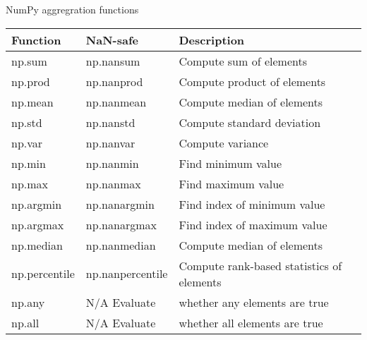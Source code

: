 \documentclass[10pt]{beamer}
\begin{document}
\begin{frame}{NumPy aggregration functions}
\begin{table}
\begin{tabular}{lll}
\textbf{Function} & \textbf{NaN-safe} & \textbf{Description}  \\
\hline
np.sum          & np.nansum        & Compute sum of elements\\
np.prod         & np.nanprod       & Compute product of elements\\
np.mean         & np.nanmean       & Compute median of elements \\
np.std          & np.nanstd        & Compute standard deviation \\
np.var          & np.nanvar        & Compute variance \\
np.min          & np.nanmin        & Find minimum value \\
np.max          & np.nanmax        & Find maximum value \\
np.argmin       & np.nanargmin     & Find index of minimum value \\
np.argmax       & np.nanargmax     & Find index of maximum value \\
np.median       & np.nanmedian     & Compute median of elements \\
np.percentile   & np.nanpercentile & Compute rank-based statistics of elements \\
np.any          & N/A Evaluate     & whether any elements are true \\
np.all          & N/A Evaluate     & whether all elements are true\\
\end{tabular}
\end{table}
\end{frame}

\end{document}
